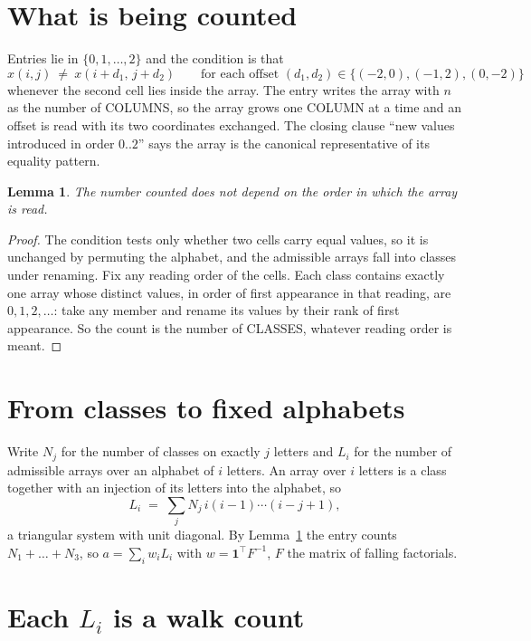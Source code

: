 \documentclass[11pt,a4paper]{article}
\theoremstyle{plain}
\newtheorem{lemma}[theorem]{Lemma}
\theoremstyle{definition}
\begin{document}
\section{What is being counted}

Entries lie in $\{0,1,\dots,2\}$ and the condition is that
\[
x(i,j)\ \ne\ x(i+d_1,\,j+d_2)\qquad\text{for each offset }(d_1,d_2)\in\{(-2,0), (-1,2), (0,-2)\}
\]
whenever the second cell lies inside the array. The entry writes the array with $n$ as the number of COLUMNS, so the array grows one COLUMN at a time and an offset is read with its two coordinates exchanged. The closing clause ``new values
introduced in order $0..2$'' says the array is the canonical representative of its equality
pattern.

\begin{lemma}\label{lem:order}
The number counted does not depend on the order in which the array is read.
\end{lemma}

\begin{proof}
The condition tests only whether two cells carry equal values, so it is unchanged by permuting
the alphabet, and the admissible arrays fall into classes under renaming. Fix any reading order
of the cells. Each class contains exactly one array whose distinct values, in order of first
appearance in that reading, are $0,1,2,\dots$: take any member and rename its values by their
rank of first appearance. So the count is the number of CLASSES, whatever reading order is
meant.
\end{proof}

\section{From classes to fixed alphabets}

Write $N_j$ for the number of classes on exactly $j$ letters and $L_i$ for the number of
admissible arrays over an alphabet of $i$ letters. An array over $i$ letters is a class together
with an injection of its letters into the alphabet, so
\[
L_i\;=\;\sum_j N_j\,i(i-1)\cdots(i-j+1),
\]
a triangular system with unit diagonal. By Lemma~\ref{lem:order} the entry counts
$N_1+\dots+N_{3}$, so $a=\sum_i w_iL_i$ with $w=\mathbf{1}^{\!\top}F^{-1}$, $F$ the
matrix of falling factorials.

\section{Each $L_i$ is a walk count}
\end{document}
